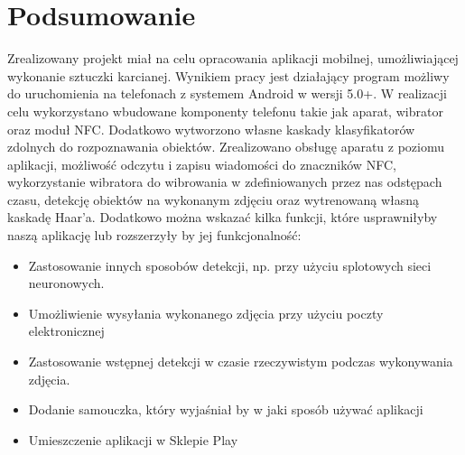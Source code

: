 \section{Podsumowanie}
Zrealizowany projekt miał na celu opracowania aplikacji mobilnej, umożliwiającej wykonanie sztuczki karcianej. Wynikiem pracy jest działający program możliwy do uruchomienia na telefonach z systemem Android w wersji 5.0+. W realizacji celu wykorzystano wbudowane komponenty telefonu takie jak aparat, wibrator oraz moduł NFC. Dodatkowo wytworzono własne kaskady klasyfikatorów zdolnych do rozpoznawania obiektów. Zrealizowano obsługę aparatu z poziomu aplikacji, możliwość odczytu i zapisu wiadomości do znaczników NFC, wykorzystanie wibratora do wibrowania w zdefiniowanych przez nas odstępach czasu, detekcję obiektów na wykonanym zdjęciu oraz wytrenowaną własną kaskadę Haar'a.
Dodatkowo można wskazać kilka funkcji, które usprawniłyby naszą aplikację lub rozszerzyły by jej funkcjonalność:
\begin{itemize}
    \item Zastosowanie innych sposobów detekcji, np. przy użyciu splotowych sieci neuronowych.
    \item Umożliwienie wysyłania wykonanego zdjęcia przy użyciu poczty elektronicznej
    \item Zastosowanie wstępnej detekcji w czasie rzeczywistym podczas wykonywania zdjęcia.
    \item Dodanie samouczka, który wyjaśniał by w jaki sposób używać aplikacji
    \item Umieszczenie aplikacji w Sklepie Play
\end{itemize}
